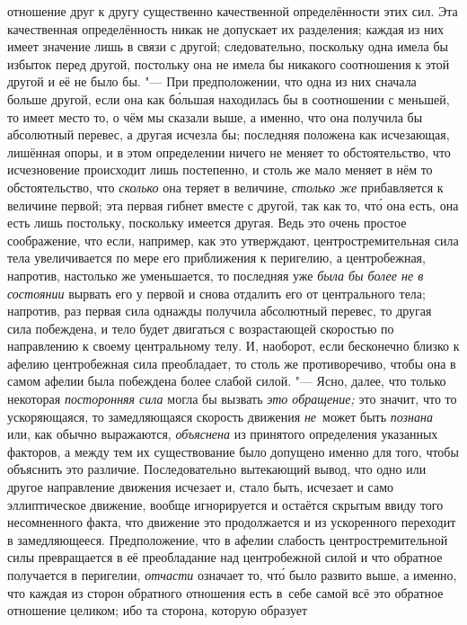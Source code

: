 отношение друг к другу существенно качественной определённости этих сил. Эта
качественная определённость никак не допускает их разделения; каждая из них
имеет значение лишь в связи с другой; следовательно, поскольку одна имела бы
избыток перед другой, постольку она не имела бы никакого соотношения к этой
другой и её не было бы. "--- При предположении, что одна из них сначала больше
другой, если она как б\'{о}льшая находилась бы в соотношении с меньшей, то
имеет место то, о чём мы сказали выше, а именно, что она получила бы абсолютный
перевес, а другая исчезла бы; последняя положена как исчезающая, лишённая
опоры, и в этом определении ничего не меняет то обстоятельство, что
исчезновение происходит лишь постепенно, и столь же мало меняет в нём то
обстоятельство, что {\em сколько} она теряет в величине, {\em столько же}
прибавляется к величине первой; эта первая гибнет вместе с другой, так как то,
чт\'{о} она есть, она есть лишь постольку, поскольку имеется другая. Ведь это
очень простое соображение, что если, например, как это утверждают,
центростремительная сила тела увеличивается по мере его приближения к
перигелию, а центробежная, напротив, настолько же уменьшается, то последняя уже
{\em была бы более не в состоянии} вырвать его у первой и снова отдалить его от
центрального тела; напротив, раз первая сила однажды получила абсолютный
перевес, то другая сила побеждена, и тело будет двигаться с возрастающей
скоростью по направлению к своему центральному телу. И, наоборот, если
бесконечно близко к афелию центробежная сила преобладает, то столь же
противоречиво, чтобы она в самом афелии была побеждена более слабой силой. "---
Ясно, далее, что только некоторая {\em посторонняя сила} могла бы вызвать
{\em это обращение;} это значит, что то ускоряющаяся, то замедляющаяся
скорость движения {\em не}~может быть {\em познана} или, как обычно выражаются,
{\em объяснена} из принятого определения
указанных факторов, а между тем их существование было
допущено именно для того, чтобы объяснить это различие. Последовательно
вытекающий вывод, что одно или другое направление движения исчезает и, стало
быть, исчезает и само эллиптическое движение, вообще игнорируется и остаётся
скрытым ввиду того несомненного факта, что движение это продолжается и из
ускоренного переходит в замедляющееся. Предположение, что в афелии слабость
центростремительной силы превращается в её преобладание над центробежной силой
и что обратное получается в перигелии, {\em отчасти} означает то, чт\'{о} было
развито выше, а именно, что каждая из сторон обратного отношения есть в~себе
самой всё это обратное отношение целиком; ибо та сторона, которую образует
